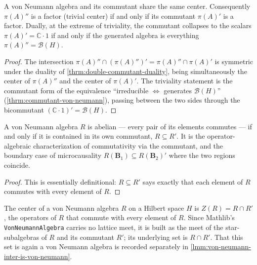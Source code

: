 \begin{theorem}
    \label{thrm:commutant-factor-duality}
    \leanok
    A von Neumann algebra and its commutant share the same center. Consequently $\pi(A)''$ is a factor (trivial center) if and only if its commutant $\pi(A)'$ is a factor. Dually, at the extreme of triviality, the commutant collapses to the scalars $\pi(A)' = \mathbb{C}\cdot 1$ if and only if the generated algebra is everything $\pi(A)'' = \mathcal{B}(H)$.
\end{theorem}
\begin{proof}
    \leanok
    The intersection $\pi(A)'' \cap (\pi(A)'')' = \pi(A)'' \cap \pi(A)'$ is symmetric under the duality of \ref{thrm:double-commutant-duality}, being simultaneously the center of $\pi(A)''$ and the center of $\pi(A)'$. The triviality statement is the commutant form of the equivalence ``irreducible $\iff$ generates $\mathcal{B}(H)$'' (\ref{thrm:commutant-von-neumann}), passing between the two sides through the bicommutant $(\mathbb{C}\cdot 1)' = \mathcal{B}(H)$.
\end{proof}

\begin{lemma}
    \label{lmm:von-neumann-abelian-self-commuting}
    \leanok
    A von Neumann algebra $R$ is abelian --- every pair of its elements commutes --- if and only if it is contained in its own commutant, $R \subseteq R'$. It is the operator-algebraic characterization of commutativity via the commutant, and the boundary case of microcausality $R(\mathbf{B}_1) \subseteq R(\mathbf{B}_2)'$ where the two regions coincide.
\end{lemma}
\begin{proof}
    \leanok
    This is essentially definitional: $R \subseteq R'$ says exactly that each element of $R$ commutes with every element of $R$.
\end{proof}

\begin{definition}
    \label{def:von-neumann-center}
    \leanok
    The center of a von Neumann algebra $R$ on a Hilbert space $H$ is $Z(R) = R \cap R'$, the operators of $R$ that commute with every element of $R$. Since Mathlib's \texttt{VonNeumannAlgebra} carries no lattice meet, it is built as the meet of the star-subalgebras of $R$ and its commutant $R'$; its underlying set is $R \cap R'$. That this set is again a von Neumann algebra is recorded separately in \ref{lmm:von-neumann-inter-is-von-neumann}.
\end{definition}

